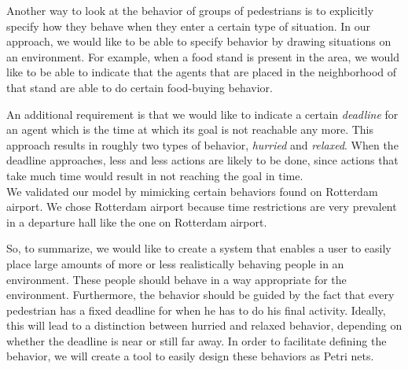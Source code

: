\documentclass[11pt]{book}
\begin{document}
Another way to look at the behavior of groups of pedestrians is to explicitly specify how they behave when they enter a certain type of situation. In our approach, we would like to be able to specify behavior by drawing situations on an environment. For example, when a food stand is present in the area, we would like to be able to indicate that the agents that are placed in the neighborhood of that stand are able to do certain food-buying behavior.

An additional requirement is that we would like to indicate a certain \emph{deadline} for an agent which is the time at which its goal is not reachable any more. This approach results in roughly two types of behavior, \emph{hurried} and \emph{relaxed}. When the deadline approaches, less and less actions are likely to be done, since actions that take much time would result in not reaching the goal in time.\\
We validated our model by mimicking certain behaviors found on Rotterdam airport. We chose Rotterdam airport because time restrictions are very prevalent in a departure hall like the one on Rotterdam airport. 

So, to summarize, we would like to create a system that enables a user to easily place large amounts of more or less realistically behaving people in an environment. These people should behave in a way appropriate for the environment. Furthermore, the behavior should be guided by the fact that every pedestrian has a fixed deadline for when he has to do his final activity. Ideally, this will lead to a distinction between hurried and relaxed behavior, depending on whether the deadline is near or still far away. In order to facilitate defining the behavior, we will create a tool to easily design these behaviors as Petri nets. 


\end{document}
